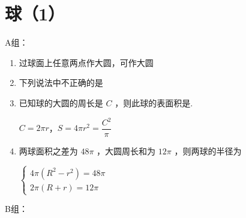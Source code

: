\section*{球（1）}
A组：
\begin{enumerate}
    \item 过球面上任意两点作大圆，可作大圆
    
    \item 下列说法中不正确的是
    
    \item 已知球的大圆的周长是 $C$ ，则此球的表面积是.
    \begin{jieda}
        $C = 2\pi r$，$S = 4\pi r^2 = \dfrac{C^2}{\pi}$
    \end{jieda}
    
    \item 两球面积之差为 ${48\pi }$ ，大圆周长和为 ${12\pi }$ ，则两球的半径为
    \begin{jieda}
        $\left\{\begin{array}{l}
             4\pi(R^2 - r^2) = 48\pi  \\
             2\pi (R+r) = 12\pi
        \end{array}\right.$
    \end{jieda}
\end{enumerate}
B组：
